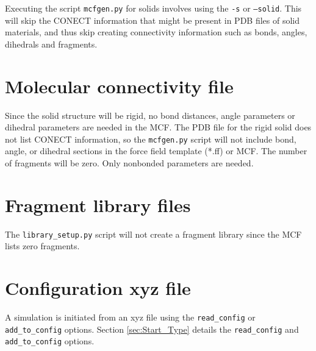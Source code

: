 Executing the script \texttt{mcfgen.py} for solids involves using the 
\texttt{-s} or \texttt{--solid}. This will skip the CONECT information
that might be present in PDB files of solid materials, and thus
skip creating connectivity information such as bonds, angles, 
dihedrals and fragments.

\section{Molecular connectivity file}\label{sec:solid_mcf}
Since the solid structure will be rigid, no bond distances, angle parameters or dihedral parameters are needed in the MCF.
The PDB file for the rigid solid does not list CONECT information, so the \texttt{mcfgen.py} script will not include bond, 
angle, or dihedral sections in the force field template (*.ff) or MCF. The number of fragments will be zero. 
Only nonbonded parameters are needed.

\section{Fragment library files}\label{sec:fragment file}
The \texttt{library\_setup.py} script will not create a fragment library since the MCF lists zero fragments.

\section{Configuration xyz file}\label{sec:solid_xyz}
A simulation is initiated from an xyz file using the \texttt{read\_config} or \texttt{add\_to\_config} options. 
Section \ref{sec:Start_Type} details the \texttt{read\_config} and \texttt{add\_to\_config} options.
